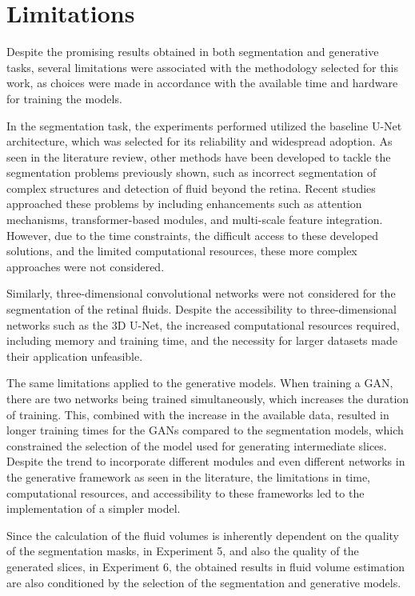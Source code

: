 \section{Limitations}

Despite the promising results obtained in both segmentation and generative tasks, several limitations were associated with the methodology selected for this work, as choices were made in accordance with the available time and hardware for training the models.
\par
In the segmentation task, the experiments performed utilized the baseline U-Net architecture, which was selected for its reliability and widespread adoption. As seen in the literature review, other methods have been developed to tackle the segmentation problems previously shown, such as incorrect segmentation of complex structures and detection of fluid beyond the retina. Recent studies approached these problems by including enhancements such as attention mechanisms, transformer-based modules, and multi-scale feature integration. However, due to the time constraints, the difficult access to these developed solutions, and the limited computational resources, these more complex approaches were not considered.
\par
Similarly, three-dimensional convolutional networks were not considered for the segmentation of the retinal fluids. Despite the accessibility to three-dimensional networks such as the 3D U-Net, the increased computational resources required, including memory and training time, and the necessity for larger datasets made their application unfeasible.
\par
The same limitations applied to the generative models. When training a GAN, there are two networks being trained simultaneously, which increases the duration of training. This, combined with the increase in the available data, resulted in longer training times for the GANs compared to the segmentation models, which constrained the selection of the model used for generating intermediate slices. Despite the trend to incorporate different modules and even different networks in the generative framework as seen in the literature, the limitations in time, computational resources, and accessibility to these frameworks led to the implementation of a simpler model.
\par
Since the calculation of the fluid volumes is inherently dependent on the quality of the segmentation masks, in Experiment 5, and also the quality of the generated slices, in Experiment 6, the obtained results in fluid volume estimation are also conditioned by the selection of the segmentation and generative models.

